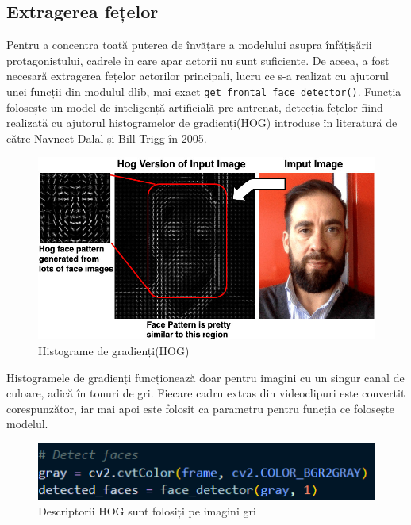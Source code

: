 \subsection{Extragerea fețelor}

Pentru a concentra toată puterea de învățare a modelului asupra înfățișării protagonistului, cadrele în care apar actorii nu sunt suficiente. De aceea, a fost necesară extragerea fețelor actorilor principali, lucru ce s-a realizat cu ajutorul unei funcții din modulul dlib, mai exact \texttt{get\_frontal\_face\_detector()}. 
Funcția folosește un model de inteligență artificială pre-antrenat, detecția fețelor fiind realizată cu ajutorul histogramelor de gradienți(HOG) introduse în literatură de către Navneet Dalal și Bill Trigg în 2005\cite{dalal2005histograms}.

\begin{figure}[ht]
         \centering 
         \includegraphics[width=0.75\linewidth]{images/HOG.jpg}
         \captionsetup{font=footnotesize}
     \caption{Histograme de gradienți(HOG)\cite{variz_2024}}
\end{figure}

\newpage

Histogramele de gradienți funcționează doar pentru imagini cu un singur canal de culoare, adică în tonuri de gri. Fiecare cadru extras din videoclipuri este convertit corespunzător, iar mai apoi este folosit ca parametru pentru funcția ce folosește modelul. 

\begin{figure}[ht]
         \centering 
         \includegraphics[width=0.8\linewidth]{images/extract_faces_ss.png}
         \captionsetup{font=footnotesize}
     \caption{Descriptorii HOG sunt folosiți pe imagini gri} 
\end{figure}

